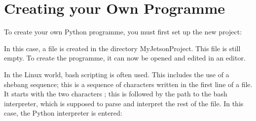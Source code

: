\section{Creating your Own Programme}

To create your own Python programme, you must first set up the new project:

\medskip







\medskip

 
 
 In this case, a file  is created in the directory MyJetsonProject. This file is still empty. To create the programme, it can now be opened and edited in an editor.
 
 
 
 In the Linux world, bash scripting is often used. This includes the use of a shebang sequence; this is a sequence of characters written in the first line of a file. It starts with the two characters \PYTHON{\#!}; this is followed by the path to the bash interpreter, which is supposed to parse and interpret the rest of the file. In this case, the Python interpreter is entered:
 


\medskip

